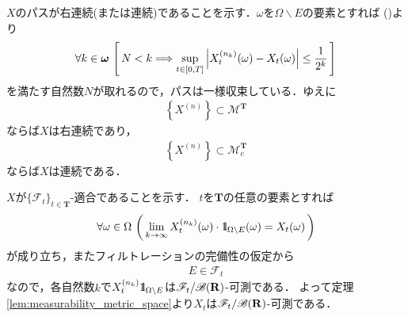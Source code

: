 \begin{sketch}
\begin{description}
				$X$のパスが右連続(または連続)であることを示す．$\omega$を$\Omega \backslash E$の要素とすれば
				()より
				\begin{align}
					\forall k \in {\boldsymbol \omega}\,
					\left[\, N < k \Longrightarrow \operatorname*{sup}_{t \in [0,T]} \left|X_t^{(n_k)}(\omega) - X_t(\omega)\right| \leq \frac{1}{2^k}\, \right]
				\end{align}
				を満たす自然数$N$が取れるので，パスは一様収束している．ゆえに
				\begin{align}
					\left\{X^{(n)}\right\} \subset \mathscr{M}^{\mathbf{T}}
				\end{align}
				ならば$X$は右連続であり，
				\begin{align}
					\left\{X^{(n)}\right\} \subset \mathscr{M}_c^{\mathbf{T}}
				\end{align}
				ならば$X$は連続である．
				
				$X$が$\{\mathscr{F}_t\}_{t \in \mathbf{T}}$-適合であることを示す．
				$t$を$\mathbf{T}$の任意の要素とすれば
				\begin{align}
					\forall \omega \in \Omega\, \left(\, 
					\lim_{k \to \infty} X_t^{(n_k)}(\omega) \cdot \mbox{1}\hspace{-0.25em}\mbox{l}_{\Omega \backslash E}(\omega) = X_t(\omega)\, \right)
				\end{align}
				が成り立ち，またフィルトレーションの完備性の仮定から
				\begin{align}
					E \in \mathscr{F}_t
				\end{align}
				なので，各自然数$k$で$X_t^{(n_k)} \mbox{1}\hspace{-0.25em}\mbox{l}_{\Omega \backslash E}$は$\mathscr{F}_t/\mathscr{B}(\mathbf{R})$-可測である．
				よって定理\ref{lem:measurability_metric_space}より$X_t$は$\mathscr{F}_t/\mathscr{B}(\mathbf{R})$-可測である．
				

\end{description}
\end{sketch}
